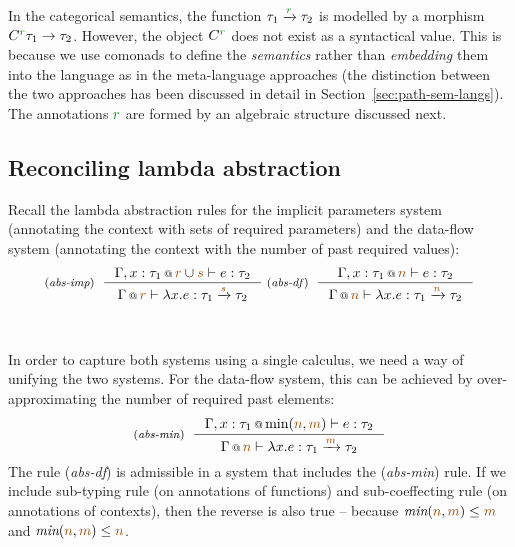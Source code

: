 In the categorical semantics, the function $\tau_1 \xrightarrow{\cclrd{r}} \tau_2$ is modelled
by a morphism $C^{\cclrd{r}} \tau_1 \rightarrow \tau_2$. However, the object $C^{\cclrd{r}}$
does not exist as a syntactical value. This is because we use comonads to define the 
\emph{semantics} rather than \emph{embedding} them into the language as in the meta-language
approaches (the distinction between the two approaches has been discussed in detail in 
Section~\ref{sec:path-sem-langs}). The annotations $\cclrd{r}$ are formed by an algebraic
structure discussed next.


\subsection{Reconciling lambda abstraction}

Recall the lambda abstraction rules for the implicit parameters system (annotating the context
with sets of required parameters) and the data-flow system (annotating the context with the
number of past required values):
%
\begin{equation*}
\tyrule{abs-imp}
  {\coctx{\Gamma, x:\tau_1}{\aclrd{r} \cup \aclrd{s}} \vdash e : \tau_2}
  {\coctx{\Gamma}{\aclrd{r}} \vdash \lambda x.e : \tau_1 \xrightarrow{\aclrd{s}} \tau_2 }
\;
\tyrule{abs-df}
  {\coctx{\Gamma, x:\tau_1}{\aclrd{n}} \vdash e : \tau_2}
  {\coctx{\Gamma}{\aclrd{n}} \vdash \lambda x.e : \tau_1 \xrightarrow{\aclrd{n}} \tau_2 }
\end{equation*}

~

In order to capture both systems using a single calculus, we need a way of unifying the two
systems. For the data-flow system, this can be achieved by over-approximating the number of 
required past elements:
%
\begin{equation*}
\tyrule{abs-min}
  {\coctx{\Gamma, x:\tau_1}{\textnormal{min}(\aclrd{n}, \aclrd{m})} \vdash e : \tau_2}
  {\coctx{\Gamma}{\aclrd{n}} \vdash \lambda x.e : \tau_1 \xrightarrow{\aclrd{m}} \tau_2 }
\end{equation*}
%
The rule (\emph{abs-df}) is admissible in a system that includes the (\emph{abs-min}) rule. 
If we include sub-typing rule (on annotations of functions) and sub-coeffecting rule (on 
annotations of contexts), then the reverse is also true -- because 
$\textit{min}(\aclrd{n}, \aclrd{m}) \leq \aclrd{m}$ and $\textit{min}(\aclrd{n}, \aclrd{m}) \leq \aclrd{n}$.


